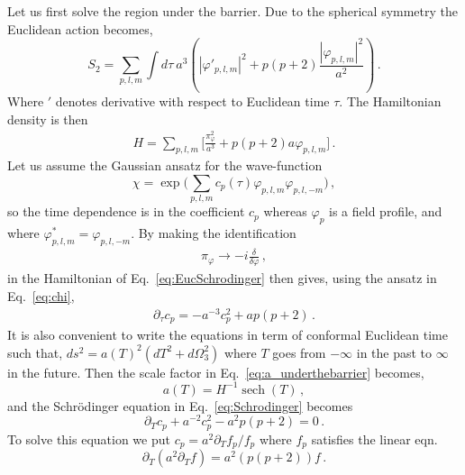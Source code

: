 \documentclass[a4paper,11pt]{article}
\numberwithin{equation}{section}
\DeclareMathOperator{\sech}{sech}
\numberwithin{equation}{section}
\begin{document}
Let us first solve the region under the barrier.
Due to the spherical symmetry the Euclidean action becomes, 
\begin{equation}
\label{eq:EuclideanQuadraticAction}
S_2=\sum_{p, l, m}\int d\tau \ a^3\left(|\varphi'_{p, l, m}|^2+p(p+2)\frac{|\varphi_{p, l, m}|^2}{a^2}\right) \,.
\end{equation} 
Where $'$ denotes derivative with respect to Euclidean time $\tau$.
The Hamiltonian density is then
\begin{align}
H=\sum_{p, l, m} \bigg[\frac{\pi_\varphi^2}{a^3}+p(p+2)a \varphi_{p, l, m} \bigg] \,.
\end{align}
Let us assume the Gaussian ansatz for the wave-function 
\begin{equation}
\label{eq:chi}
\chi=\exp\bigg(\sum_{p, l, m}c_p(\tau)\varphi_{p, l, m}\varphi_{p, l, -m}\bigg) \,,
\end{equation}
so the time dependence is in the coefficient $c_p$ whereas $\varphi_p$ is a field profile, and where $\varphi_{p, l, m}^*=\varphi_{p, l, -m}$. By making the identification
\begin{align}
\pi_\varphi\to-i\frac{\delta}{\delta\varphi} \,,
\end{align}
in the Hamiltonian of Eq.~\eqref{eq:EucSchrodinger} then gives, using the ansatz in Eq.~\eqref{eq:chi},
\begin{align}
\partial_\tau c_p=-a^{-3}c_p^{2}+a p(p+2) \,.
\end{align}
It is also convenient to write the equations in term of conformal Euclidean time such that, $ds^2=a(T)^2(dT^2+d\Omega_3^2)$ where $T$ goes from $-\infty$ in the past to $\infty$ in the future. Then the scale factor in Eq.~\eqref{eq:a_underthebarrier} becomes,
\begin{equation}
\label{eq:EuclideanScaleFactor}
a(T)=H^{-1}\sech(T) \,,
\end{equation}
and the Schr\"odinger equation in Eq.~\eqref{eq:Schrodinger} becomes
\begin{equation}
\partial_T c_p +a^{-2} c_p^2-a^{2}p(p+2)=0 \,.
\end{equation}
To solve this equation we put $c_p=a^2\partial_T f_p/f_p$ where $f_p$ satisfies the linear eqn.
\begin{equation}
\partial_T\left(a^2 \partial_T f\right)=a^2(p(p+2))f \,.
\end{equation}
\end{document}
